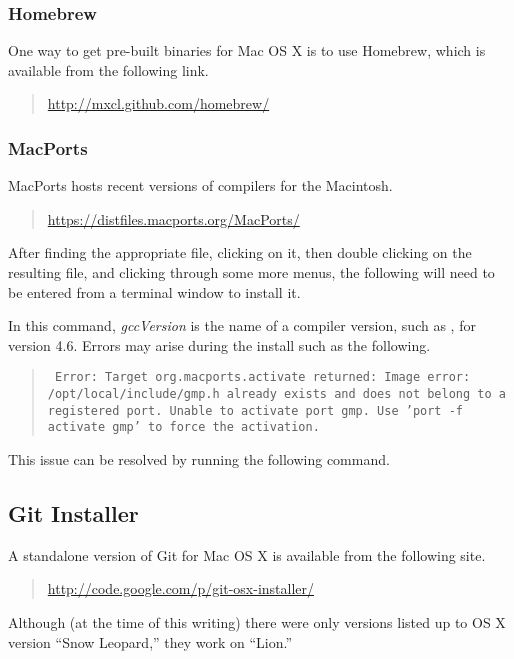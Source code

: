 \subsubsection{Homebrew}

One way to get pre-built binaries for Mac OS X is to use Homebrew,
which is available from the following link.
\begin{quote}
\url{http://mxcl.github.com/homebrew/}
\end{quote}

\subsubsection{MacPorts}

MacPorts hosts recent versions of compilers for the Macintosh.
%
\begin{quote}
\url{https://distfiles.macports.org/MacPorts/}
\end{quote}
%
After finding the appropriate  file, clicking on it, then
double clicking on the resulting  file, and clicking
through some more menus, the following will need to be entered from a
terminal window to install it.
%
\begin{quote}
\end{quote}
%
In this command, {\slshape gccVersion} is the name of a compiler
version, such as , for version 4.6.  Errors may arise
during the install such as the following.
%
\begin{quote}\small\tt
  Error: Target org.macports.activate returned: Image error:
  /opt/local/include/gmp.h already exists and does not belong to a
  registered port.  Unable to activate port gmp. Use 'port -f activate
  gmp' to force the activation.
\end{quote}
%
This issue can be resolved by running the following command.
%
\begin{quote}
\end{quote}
%


\subsection{Git Installer}

A standalone version of Git for Mac OS X is available from the
following site. 
%
\begin{quote}
\url{http://code.google.com/p/git-osx-installer/}
\end{quote}
%
Although (at the time of this writing) there were only versions listed
up to OS X version ``Snow Leopard,'' they work on ``Lion.''

